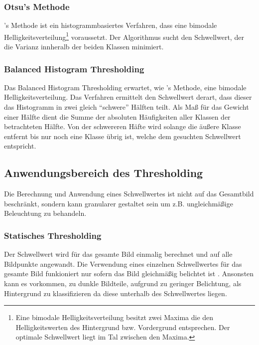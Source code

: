 
\subsubsection*{Otsu's Methode}
's Methode \cite{otsu1979} ist ein histogrammbasiertes Verfahren, dass eine bimodale Helligkeitsverteilung\footnote{Eine bimodale Helligkeitsverteilung besitzt zwei Maxima die den Helligkeitswerten des Hintergrund bzw. Vordergrund entsprechen. Der optimale Schwellwert liegt im Tal zwischen den Maxima.} voraussetzt.
Der Algorithmus sucht den Schwellwert, der die Varianz innheralb der beiden Klassen minimiert.

\subsubsection*{Balanced Histogram Thresholding}
Das Balanced Histogram Thresholding \cite{DBLP:conf/biostec/AnjosS08} erwartet, wie 's Methode, eine bimodale Helligkeitsverteilung.
Das Verfahren ermittelt den Schwellwert derart, dass dieser das Histogramm in zwei gleich "`schwere"' Hälften teilt.
Als Maß für das Gewicht einer Hälfte dient die Summe der absoluten Häufigkeiten aller Klassen der betrachteten Hälfte.
Von der schwereren Häfte wird solange die äußere Klasse entfernt bis nur noch eine Klasse übrig ist, welche dem gesuchten Schwellwert entspricht.

\subsection*{Anwendungsbereich des Thresholding}
Die Berechnung und Anwendung eines Schwellwertes ist nicht auf das Gesamtbild beschränkt, sondern kann granularer gestaltet sein um z.B. ungleichmäßige Beleuchtung zu behandeln.

\subsubsection*{Statisches Thresholding}
Der Schwellwert wird für das gesamte Bild einmalig berechnet und auf alle Bildpunkte angewandt.
Die Verwendung eines einzelnen Schwellwertes für das gesamte Bild funkioniert nur sofern das Bild gleichmäßig belichtet ist \cite[Kapitel~4.3]{davies2012}.
Ansonsten kann es vorkommen, zu dunkle Bildteile, aufgrund zu geringer Belichtung, als Hintergrund zu klassifizieren da diese unterhalb des Schwellwertes liegen.

